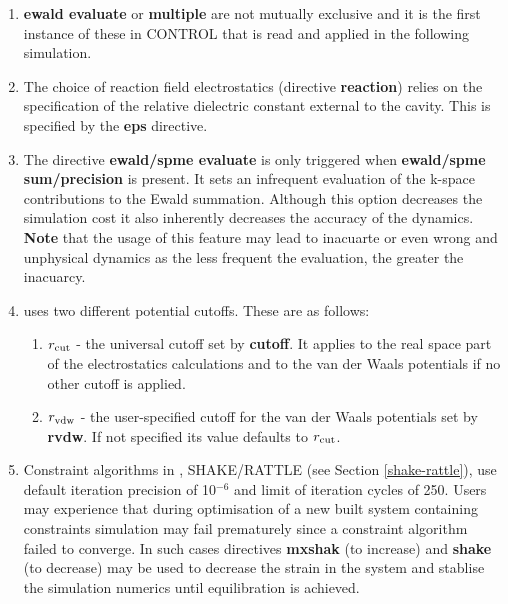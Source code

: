 \begin{enumerate}
\item {\bf ewald evaluate} or {\bf multiple} are not mutually
exclusive and it is the first instance of these in CONTROL that
is read and applied in the following simulation.

\item The choice of reaction field electrostatics
(directive {\bf reaction}) relies on the specification of the
relative dielectric constant external to the cavity.  This is
specified by the {\bf eps} directive.

\item The directive {\bf ewald/spme evaluate} is only triggered
when {\bf ewald/spme sum/precision} is present.  It sets an infrequent
evaluation of the k-space contributions to the Ewald summation.
Although this option decreases the simulation cost it also inherently
decreases the accuracy of the dynamics.  {\bf Note} that the usage of
this feature may lead to inacuarte or even wrong and unphysical
dynamics as the less frequent the evaluation, the greater the inacuarcy.

\item \D uses two different potential cutoffs.  These are as
follows:
\begin{enumerate}
\item  $r_{\rm cut}$ - the universal cutoff set by {\bf cutoff}.
It applies to the real space part of the electrostatics calculations
and to the van der Waals potentials if
no other cutoff is applied.
\item $r_{\rm vdw}$ - the user-specified cutoff for the van
der Waals potentials set by {\bf rvdw}.  If not specified its value
defaults to $r_{\rm cut}$.
\end{enumerate}

\item Constraint algorithms in \D, SHAKE/RATTLE (see Section
\ref{shake-rattle}), use default iteration precision of 10$^{-6}$
and limit of iteration cycles of 250.  Users may experience that
during optimisation of a new built system containing constraints
simulation may fail prematurely since a constraint algorithm failed
to converge.  In such cases directives {\bf mxshak} (to increase)
and {\bf shake} (to decrease) may be used to decrease the strain in
the system and stablise the simulation numerics until equilibration
is achieved.


\end{enumerate}
